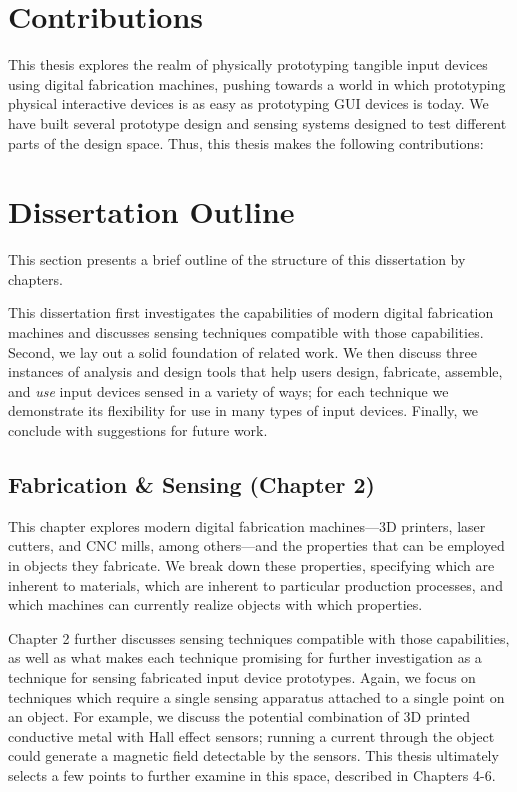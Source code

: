 \section{Contributions}

This thesis explores the realm of physically prototyping tangible input devices using digital fabrication machines, pushing towards a world in which prototyping physical interactive devices is as easy as prototyping GUI devices is today. We have built several prototype design and sensing systems designed to test different parts of the design space. Thus, this thesis makes the following contributions:



\section{Dissertation Outline}

This section presents a brief outline of the structure of this dissertation by chapters.

This dissertation first investigates the capabilities of modern digital fabrication machines and discusses sensing techniques compatible with those capabilities. Second, we lay out a solid foundation of related work. We then discuss three instances of analysis and design tools that help users design, fabricate, assemble, and \emph{use} input devices sensed in a variety of ways; for each technique we demonstrate its flexibility for use in many types of input devices. Finally, we conclude with suggestions for future work.

\subsection{Fabrication \& Sensing (Chapter 2)}

This chapter explores modern digital fabrication machines---3D printers, laser cutters, and CNC mills, among others---and the properties that can be employed in objects they fabricate. We break down these properties, specifying which are inherent to materials, which are inherent to particular production processes, and which machines can currently realize objects with which properties.

Chapter 2 further discusses sensing techniques compatible with those capabilities, as well as what makes each technique promising for further investigation as a technique for sensing fabricated input device prototypes. Again, we focus on techniques which require a single sensing apparatus attached to a single point on an object. For example, we discuss the potential combination of 3D printed conductive metal with Hall effect sensors; running a current through the object could generate a magnetic field detectable by the sensors. This thesis ultimately selects a few points to further examine in this space, described in Chapters 4-6.

